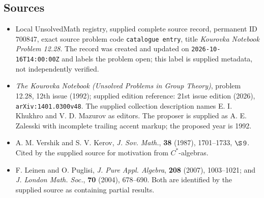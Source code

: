 \documentclass[11pt]{article}
\begin{document}
\subsection{Sources}
\begin{itemize}
\item Local UnsolvedMath registry, supplied complete source record, permanent ID \(700847\), exact source problem code \texttt{catalogue entry}, title \emph{Kourovka Notebook Problem 12.28}. The record was created and updated on \texttt{2026-10-16T14:00:00Z} and labels the problem open; this label is supplied metadata, not independently verified.
\item \emph{The Kourovka Notebook (Unsolved Problems in Group Theory)}, problem 12.28, 12th issue (1992); supplied edition reference: 21st issue edition (2026), \texttt{arXiv:1401.0300v48}. The supplied collection description names E. I. Khukhro and V. D. Mazurov as editors. The proposer is supplied as A. E. Zalesski with incomplete trailing accent markup; the proposed year is 1992.
\item A. M. Vershik and S. V. Kerov, \emph{J. Sov. Math.}, \textbf{38} (1987), 1701--1733, \(\S\,9\). Cited by the supplied source for motivation from \(C^*\)-algebras.
\item F. Leinen and O. Puglisi, \emph{J. Pure Appl. Algebra}, \textbf{208} (2007), 1003--1021; and \emph{J. London Math. Soc.}, \textbf{70} (2004), 678--690. Both are identified by the supplied source as containing partial results.
\end{itemize}
\end{document}
